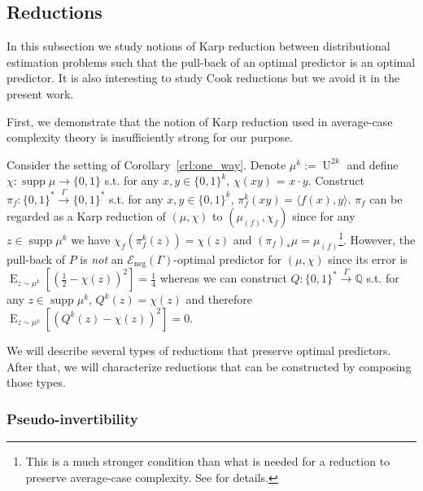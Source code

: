 \documentclass{article}
\numberwithin{equation}{section}
\theoremstyle{definition}
\theoremstyle{plain}
\newcommand{\Bool}{\{0,1\}}
\newcommand{\Words}{{\Bool^*}}
\DeclareMathOperator{\Supp}{supp}
\DeclareMathOperator{\E}{E}
\DeclareMathOperator{\Un}{U}
\newcommand{\Rats}{\mathbb{Q}}
\newcommand{\Chev}[1]{\langle #1 \rangle}
\newcommand{\Fall}{\mathcal{E}}
\newcommand{\Scheme}{\xrightarrow{\Gamma}}
\begin{document}
\subsection{Reductions}
\label{sub:reductions}

In this subsection we study notions of Karp reduction between distributional estimation problems such that the pull-back of an optimal predictor is an optimal predictor. It is also interesting to study Cook reductions but we avoid it in the present work.

First, we demonstrate that the notion of Karp reduction used in average-case complexity theory is insufficiently strong for our purpose. 

Consider the setting of Corollary~\ref{crl:one_way}. Denote $\mu^k:=\Un^{2k}$ and define ${\chi: \Supp \mu \rightarrow \Bool}$ s.t. for any $x,y \in \Bool^k$, $\chi(xy)$ = $x \cdot y$. Construct $\pi_f: \Words \Scheme \Words$ s.t. for any $x,y \in \Bool^k$, ${\pi_f^k(xy) = \Chev{f(x),y}}$. $\pi_f$ can be regarded as a Karp reduction of $(\mu, \chi)$ to $(\mu_{(f)},\chi_f)$ since for any ${z \in \Supp \mu^k}$ we have $\chi_f(\pi_f^k(z))=\chi(z)$ and $(\pi_f)_*\mu=\mu_{(f)}$\footnote{This is a much stronger condition than what is needed for a reduction to preserve average-case complexity. See \cite{Bogdanov_2006} for details.}. However, the pull-back of $P$ is \emph{not} an $\Fall_{\text{neg}}(\Gamma)$-optimal predictor for $(\mu,\chi)$ since its error is $\E_{z \sim \mu^k}[(\frac{1}{2}-\chi(z))^2]=\frac{1}{4}$ whereas we can construct $Q: \Words \Scheme \Rats$ s.t. for any $z \in \Supp \mu^k$, $Q^k(z)=\chi(z)$ and therefore $\E_{z \sim \mu^k}[(Q^k(z)-\chi(z))^2]=0$.

We will describe several types of reductions that preserve optimal predictors. After that, we will characterize reductions that can be constructed by composing those types.

\subsubsection{Pseudo-invertibility}
\end{document}
